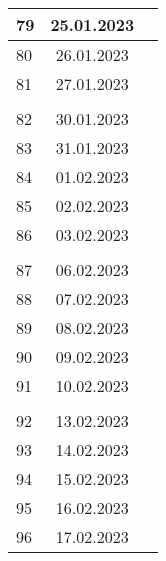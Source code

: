 \begin{longtable}{|l|c|l|}
79  & 25.01.2023    &                                                       \\ \hline 
80  & 26.01.2023    &                                                       \\ \hline 
81  & 27.01.2023    &                                                       \\ \hline
&               &                                                       \\ \hline  
82  & 30.01.2023    &                                                       \\ \hline 
83  & 31.01.2023    &                                                       \\ \hline 
84  & 01.02.2023    &                                                       \\ \hline 
85  & 02.02.2023    &                                                       \\ \hline 
86  & 03.02.2023    &                                                       \\ \hline
&               &                                                       \\ \hline  
87  & 06.02.2023    &                                                       \\ \hline 
88  & 07.02.2023    &                                                       \\ \hline 
89  & 08.02.2023    &                                                       \\ \hline 
90  & 09.02.2023    &                                                       \\ \hline 
91  & 10.02.2023    &                                                       \\ \hline
&               &                                                       \\ \hline  
92  & 13.02.2023    &                                                       \\ \hline 
93  & 14.02.2023    &                                                       \\ \hline 
94  & 15.02.2023    &                                                       \\ \hline 
95  & 16.02.2023    &                                                       \\ \hline 
96  & 17.02.2023    &                                                       \\ \hline

\end{longtable}
